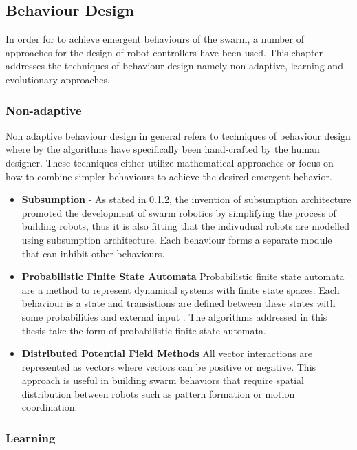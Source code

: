 \subsection{Behaviour Design}

In order for to achieve emergent behaviours of the swarm, a number of approaches for the design of robot controllers have been used. This chapter addresses the techniques of behaviour design namely non-adaptive, learning and evolutionary approaches.

\subsubsection{Non-adaptive}
Non adaptive behaviour design in general refers to techniques of behaviour design where by the algorithms have specifically been hand-crafted by the human designer. These techniques either utilize mathematical approaches or focus on how to combine simpler behaviours to achieve the desired emergent behavior. 

\begin{itemize}
	\item \textbf{Subsumption} - As stated in \ref{}, the invention of subsumption architecture promoted the development of swarm robotics by simplifying the process of building robots, thus it is also fitting that the indivudual robots are modelled using subsumption architecture. Each behaviour forms a separate module that can inhibit other behaviours. 
	
	\item \textbf{Probabilistic Finite State Automata} Probabilistic finite state automata are a method to represent dynamical systems with finite state spaces. Each behaviour is a state and transistions are defined between these states with some probabilities and external input \cite{soysal2005probabilistic,labella2004efficiency}. The algorithms addressed in this thesis take the form of probabilistic finite state automata.  
	
	\item \textbf{Distributed Potential Field Methods}
	All vector interactions are represented as vectors where vectors can be positive or negative. This approach is useful in building swarm behaviors that require spatial distribution between robots such as pattern formation or motion coordination. %
\end{itemize}

\subsubsection{Learning}

